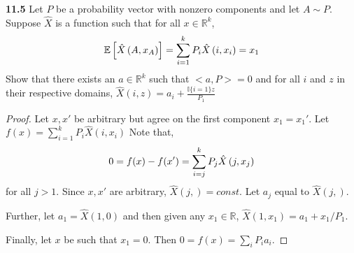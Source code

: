 \noindent\textbf{11.5} Let $P$ be a probability vector with nonzero components and let $A\sim P$. Suppose $\hat{X}$ is a function such that for all $x\in \mathbb{R}^k$,
\begin{equation}
    \mathbb{E}\left[\hat{X}\left(A, x_{A}\right)\right]=\sum_{i=1}^{k} P_{i} \hat{X}\left(i, x_{i}\right)=x_{1}\notag
\end{equation}
Show that there exists an $a\in \mathbb{R}^k$ such that $<a,P>=0$ and for all $i$ and $z$ in their respective domains, $\hat{X}(i, z)=a_{i}+\frac{\mathbb{I}\{i=1\} z}{P_{1}}$
\begin{proof}
    Let $x, x'$ be arbitrary but agree on the first component $x_1=x_1'$. Let $f(x)=\sum_{i=1}^{k} P_{i} \hat{X}\left(i, x_{i}\right)$ Note that,
    \begin{equation}
        0=f(x)-f(x')=\sum_{i=j}^{k} P_{j} \hat{X}\left(j, x_{j}\right)\notag
    \end{equation}
    for all $j>1$. Since $x, x'$ are arbitrary, $\hat{X}(j, )=const$. Let $a_j$ equal to $\hat{X}(j, )$.
    \par Further, let $a_1=\hat{X}(1, 0)$ and then given any $x_1\in \mathbb{R}$, $\hat{X}\left(1, x_{1}\right)=a_{1}+x_{1} / P_{1}$.
    \par Finally, let $x$ be such that $x_1=0$. Then $0=f(x)=\sum_{i} P_{i} a_{i}$.
\end{proof}

